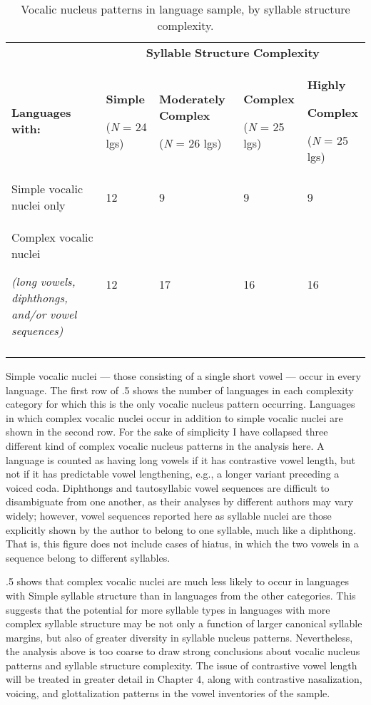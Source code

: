 \begin{table}
\begin{tabularx}{\textwidth}{XXXXX}
 & \multicolumn{4}{c}{ \textbf{Syllable} \textbf{Structure} \textbf{Complexity}}\\
\lsptoprule
 \textbf{Languages} \textbf{with:} & { \textbf{Simple}}

 (\textit{N} = 24 lgs) & { \textbf{Moderately} \textbf{Complex}}

 (\textit{N} = 26 lgs) & { \textbf{Complex}}

 (\textit{N} = 25 lgs) & { \textbf{Highly} }

{ \textbf{Complex}}

 (\textit{N} = 25 lgs)\\
 Simple vocalic nuclei only & 12 & 9 & 9 & 9\\
{ Complex vocalic nuclei} 

 \textit{(long} \textit{vowels,} \textit{diphthongs,} \textit{and/or} \textit{vowel} \textit{sequences)} & 12 & 17 & 16 & 16\\
\lspbottomrule
\end{tabularx}
\caption{\label{3.5}Vocalic nucleus patterns in language sample, by syllable structure complexity.}
\end{table}




  Simple vocalic nuclei — those consisting of a single short vowel — occur in every language. The first row of .5 shows the number of languages in each complexity category for which this is the only vocalic nucleus pattern occurring. Languages in which complex vocalic nuclei occur in addition to simple vocalic nuclei are shown in the second row. For the sake of simplicity I have collapsed three different kind of complex vocalic nucleus patterns in the analysis here. A language is counted as having long vowels if it has contrastive vowel length, but not if it has predictable vowel lengthening, e.g., a longer variant preceding a voiced coda. Diphthongs and tautosyllabic vowel sequences are difficult to disambiguate from one another, as their analyses by different authors may vary widely; however, vowel sequences reported here as syllable nuclei are those explicitly shown by the author to belong to one syllable, much like a diphthong. That is, this figure does not include cases of hiatus, in which the two vowels in a sequence belong to different syllables.



  .5 shows that complex vocalic nuclei are much less likely to occur in languages with Simple syllable structure than in languages from the other categories. This suggests that the potential for more syllable types in languages with more complex syllable structure may be not only a function of larger canonical syllable margins, but also of greater diversity in syllable nucleus patterns. Nevertheless, the analysis above is too coarse to draw strong conclusions about vocalic nucleus patterns and syllable structure complexity. The issue of contrastive vowel length will be treated in greater detail in Chapter 4, along with contrastive nasalization, voicing, and glottalization patterns in the vowel inventories of the sample.


